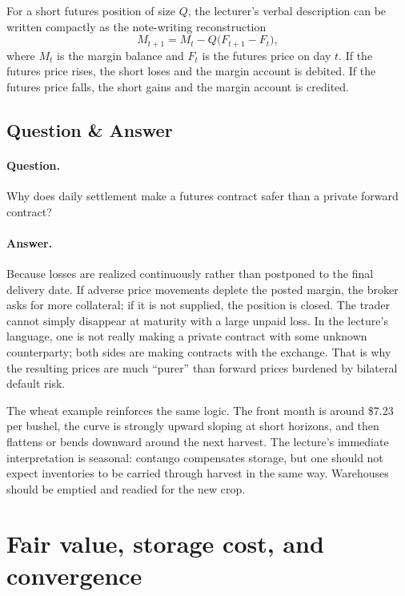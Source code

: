 For a short futures position of size $Q$, the lecturer's verbal description can be written compactly as the note-writing reconstruction
\begin{equation}
M_{t+1}=M_t-Q\bigl(F_{t+1}-F_t\bigr),
\end{equation}
where $M_t$ is the margin balance and $F_t$ is the futures price on day $t$. If the futures price rises, the short loses and the margin account is debited. If the futures price falls, the short gains and the margin account is credited.

\subsection{Question \& Answer}

\paragraph{Question.} Why does daily settlement make a futures contract safer than a private forward contract?

\paragraph{Answer.} Because losses are realized continuously rather than postponed to the final delivery date. If adverse price movements deplete the posted margin, the broker asks for more collateral; if it is not supplied, the position is closed. The trader cannot simply disappear at maturity with a large unpaid loss. In the lecture's language, one is not really making a private contract with some unknown counterparty; both sides are making contracts with the exchange. That is why the resulting prices are much ``purer'' than forward prices burdened by bilateral default risk.

The wheat example reinforces the same logic. The front month is around \$7.23 per bushel, the curve is strongly upward sloping at short horizons, and then flattens or bends downward around the next harvest. The lecture's immediate interpretation is seasonal: contango compensates storage, but one should not expect inventories to be carried through harvest in the same way. Warehouses should be emptied and readied for the new crop.

\section{Fair value, storage cost, and convergence}

